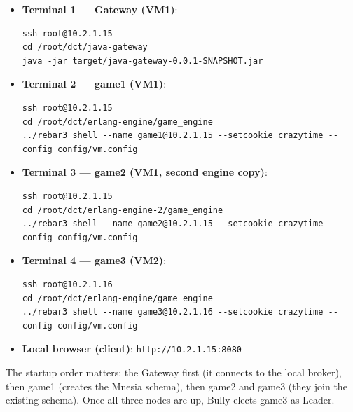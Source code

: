 \documentclass[12pt,a4paper]{article}
\begin{document}
\begin{itemize}
    \item \textbf{Terminal 1 --- Gateway (VM1)}:
\begin{lstlisting}[basicstyle=\ttfamily, breaklines=true]
ssh root@10.2.1.15
cd /root/dct/java-gateway
java -jar target/java-gateway-0.0.1-SNAPSHOT.jar
\end{lstlisting}
    \item \textbf{Terminal 2 --- game1 (VM1)}:
\begin{lstlisting}[basicstyle=\ttfamily, breaklines=true]
ssh root@10.2.1.15
cd /root/dct/erlang-engine/game_engine
../rebar3 shell --name game1@10.2.1.15 --setcookie crazytime --config config/vm.config
\end{lstlisting}
    \item \textbf{Terminal 3 --- game2 (VM1, second engine copy)}:
\begin{lstlisting}[basicstyle=\ttfamily, breaklines=true]
ssh root@10.2.1.15
cd /root/dct/erlang-engine-2/game_engine
../rebar3 shell --name game2@10.2.1.15 --setcookie crazytime --config config/vm.config
\end{lstlisting}
    \item \textbf{Terminal 4 --- game3 (VM2)}:
\begin{lstlisting}[basicstyle=\ttfamily, breaklines=true]
ssh root@10.2.1.16
cd /root/dct/erlang-engine/game_engine
../rebar3 shell --name game3@10.2.1.16 --setcookie crazytime --config config/vm.config
\end{lstlisting}
    \item \textbf{Local browser (client)}: \texttt{http://10.2.1.15:8080}
\end{itemize}

The startup order matters: the Gateway first (it connects to the local broker), then game1 (creates the Mnesia schema), then game2 and game3 (they join the existing schema). Once all three nodes are up, Bully elects game3 as Leader.
\end{document}
